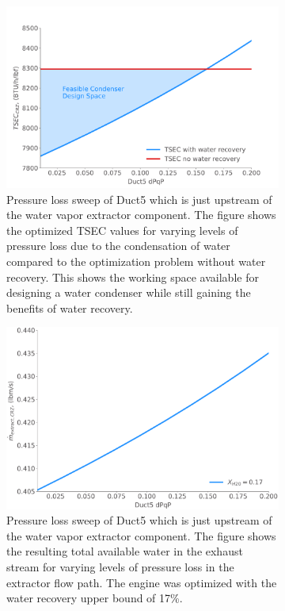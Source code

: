 \documentclass[conf]{new-aiaa}
\begin{document}
\begin{figure}[hbt!]
    \centering
    \begin{subfigure}[t]{0.49\textwidth}
        \includegraphics[width=\textwidth]{N3_dpqp.pdf}
        \caption{Pressure loss sweep of Duct5 which is just upstream of the water vapor extractor component.
            The figure shows the optimized TSEC values for varying levels of pressure loss due to the condensation of water compared to the optimization problem without water recovery.
            This shows the working space available for designing a water condenser while still gaining the benefits of water recovery.}
        \label{fig:dpqp_sweep}
    \end{subfigure}
    \hspace{2pt}
    \begin{subfigure}[t]{0.49\textwidth}
        \includegraphics[width=\textwidth]{N3_wdot.pdf}
        \caption{Pressure loss sweep of Duct5 which is just upstream of the water vapor extractor component.
            The figure shows the resulting total available water in the exhaust stream for varying levels of pressure loss in the extractor flow path.
            The engine was optimized with the water recovery upper bound of 17\%.
        }
        \label{fig:dpqp_wdot}
    \end{subfigure}
    \caption{}
    \label{fig:dpqp_study}
\end{figure}
\end{document}
